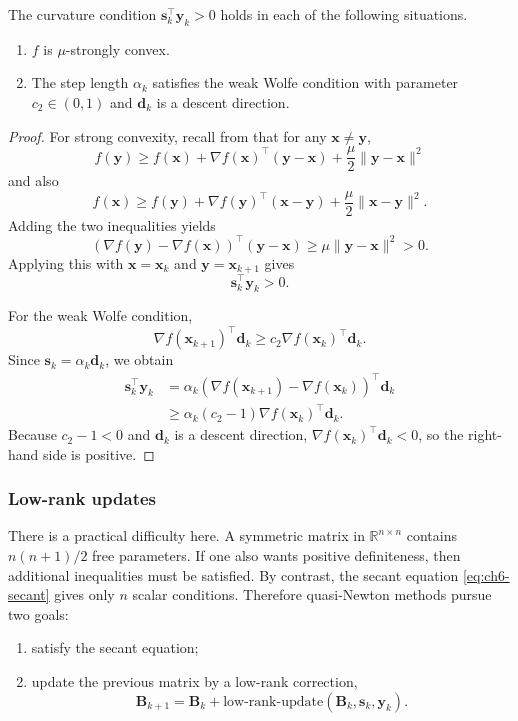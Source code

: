 \begin{claim}
\label{clm:ch6-curvature-condition}
The curvature condition $\mathbf{s}_k^\top\mathbf{y}_k>0$ holds in each of the
following situations.
\begin{enumerate}
  \item $f$ is $\mu$-strongly convex.
  \item The step length $\alpha_k$ satisfies the weak Wolfe condition with
  parameter $c_2\in(0,1)$ and $\mathbf{d}_k$ is a descent direction.
\end{enumerate}
\end{claim}
\begin{proof}
For strong convexity, recall from  that for any
$\mathbf{x}\neq \mathbf{y}$,
\[
  f(\mathbf{y})\ge f(\mathbf{x})+\nabla f(\mathbf{x})^\top(\mathbf{y}-\mathbf{x})
  +\frac{\mu}{2}\|\mathbf{y}-\mathbf{x}\|^2
\]
and also
\[
  f(\mathbf{x})\ge f(\mathbf{y})+\nabla f(\mathbf{y})^\top(\mathbf{x}-\mathbf{y})
  +\frac{\mu}{2}\|\mathbf{x}-\mathbf{y}\|^2.
\]
Adding the two inequalities yields
\[
  (\nabla f(\mathbf{y})-\nabla f(\mathbf{x}))^\top(\mathbf{y}-\mathbf{x})
  \ge \mu \|\mathbf{y}-\mathbf{x}\|^2>0.
\]
Applying this with $\mathbf{x}=\mathbf{x}_k$ and
$\mathbf{y}=\mathbf{x}_{k+1}$ gives
\[
  \mathbf{s}_k^\top \mathbf{y}_k>0.
\]

For the weak Wolfe condition,
\[
  \nabla f(\mathbf{x}_{k+1})^\top \mathbf{d}_k
  \ge c_2 \nabla f(\mathbf{x}_k)^\top \mathbf{d}_k.
\]
Since $\mathbf{s}_k=\alpha_k \mathbf{d}_k$, we obtain
\begin{align*}
  \mathbf{s}_k^\top \mathbf{y}_k
  &=\alpha_k(\nabla f(\mathbf{x}_{k+1})-\nabla f(\mathbf{x}_k))^\top\mathbf{d}_k\\
  &\ge \alpha_k(c_2-1)\nabla f(\mathbf{x}_k)^\top \mathbf{d}_k.
\end{align*}
Because $c_2-1<0$ and $\mathbf{d}_k$ is a descent direction,
$\nabla f(\mathbf{x}_k)^\top\mathbf{d}_k<0$, so the right-hand side is
positive.
\end{proof}


\subsubsection{Low-rank updates}
\label{sec:ch6-sr1}
There is a practical difficulty here. A symmetric matrix in
$\mathbb{R}^{n\times n}$ contains $n(n+1)/2$ free parameters. If one also
wants positive definiteness, then additional inequalities must be satisfied.
By contrast, the secant equation \eqref{eq:ch6-secant} gives only $n$ scalar
conditions. Therefore quasi-Newton methods pursue two goals:
\begin{enumerate}
  \item satisfy the secant equation;
  \item update the previous matrix by a low-rank correction,
  \[
    \mathbf{B}_{k+1}
    =\mathbf{B}_k+\text{low-rank-update}(\mathbf{B}_k,\mathbf{s}_k,\mathbf{y}_k).
  \]
\end{enumerate}

